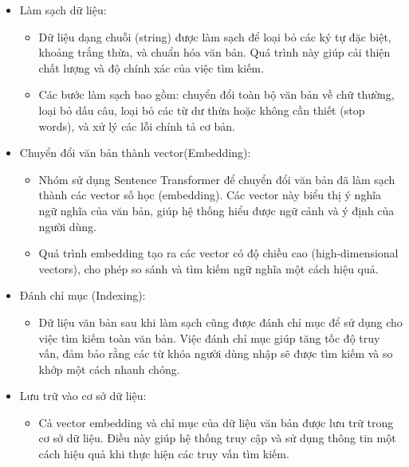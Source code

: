 \begin{itemize}
    \item Làm sạch dữ liệu:
    \begin{itemize}
        \item Dữ liệu dạng chuỗi (string) được làm sạch để loại bỏ các ký tự đặc biệt, khoảng trắng thừa, và chuẩn hóa văn bản. Quá trình này giúp cải thiện chất lượng và độ chính xác của việc tìm kiếm.
        \item Các bước làm sạch bao gồm: chuyển đổi toàn bộ văn bản về chữ thường, loại bỏ dấu câu, loại bỏ các từ dư thừa hoặc không cần thiết (stop words), và xử lý các lỗi chính tả cơ bản.
    \end{itemize}
    \item Chuyển đổi văn bản thành vector(Embedding):
    \begin{itemize}
        \item Nhóm sử dụng Sentence Transformer để chuyển đổi văn bản đã làm sạch thành các vector số học (embedding). Các vector này biểu thị ý nghĩa ngữ nghĩa của văn bản, giúp hệ thống hiểu được ngữ cảnh và ý định của người dùng.
        \item Quá trình embedding tạo ra các vector có độ chiều cao (high-dimensional vectors), cho phép so sánh và tìm kiếm ngữ nghĩa một cách hiệu quả.
    \end{itemize}
    \item Đánh chỉ mục (Indexing):
    \begin{itemize}
        \item Dữ liệu văn bản sau khi làm sạch cũng được đánh chỉ mục để sử dụng cho việc tìm kiếm toàn văn bản. Việc đánh chỉ mục giúp tăng tốc độ truy vấn, đảm bảo rằng các từ khóa người dùng nhập sẽ được tìm kiếm và so khớp một cách nhanh chóng.
    \end{itemize}
    \item Lưu trữ vào cơ sở dữ liệu:
    \begin{itemize}
        \item Cả vector embedding và chỉ mục của dữ liệu văn bản được lưu trữ trong cơ sở dữ liệu. Điều này giúp hệ thống truy cập và sử dụng thông tin một cách hiệu quả khi thực hiện các truy vấn tìm kiếm.
    \end{itemize}
\end{itemize}
